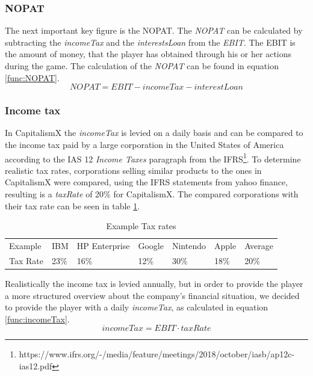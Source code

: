\subsubsection{NOPAT}

The next important key figure is the \gls{NOPAT}. The \textit{NOPAT} can be calculated by subtracting the \textit{incomeTax} and the \textit{interestsLoan} from the \textit{EBIT}. The \gls{EBIT} is the amount of money, that the player has obtained through his or her actions during the game. The calculation of the \textit{NOPAT} can be found in equation \ref{func:NOPAT}.
\begin{equation}
    \label{func:NOPAT}
    NOPAT = EBIT - incomeTax - interestLoan 
\end{equation}
 
\subsubsection{Income tax}
\label{sec:incomeTax}

In CapitalismX the \textit{incomeTax} is levied on a daily basis and can be compared to the income tax paid by a large corporation in the United States of America according to the IAS 12 \textit{Income Taxes} paragraph from the IFRS\footnote{https://www.ifrs.org/-/media/feature/meetings/2018/october/iasb/ap12c-ias12.pdf}. To determine realistic tax rates, corporations selling similar products to the ones in CapitalismX were compared, using the IFRS statements from yahoo finance, resulting is a \textit{taxRate} of 20\% for CapitalismX. The compared corporations with their tax rate can be seen in table \ref{Example_Tax}.

\begin{table}[!h]
\centering
\begin{tabular}{|l|l|l|l|l|l|l|}
\hline
Example & IBM & HP Enterprise & Google & Nintendo & Apple & Average \\
Tax Rate & 23\% & 16\% & 12\% & 30\% & 18\% & 20\% \\ \hline
\end{tabular}
\caption{Example Tax rates}
\label{Example_Tax}
\end{table}

Realistically the income tax is levied annually, but in order to provide the player a more structured overview about the company’s financial situation, we decided to provide the player with a daily \textit{incomeTax}, as calculated in equation \ref{func:incomeTax}. 
\begin{equation}
    \label{func:incomeTax}
    incomeTax = EBIT \cdot taxRate
\end{equation}

